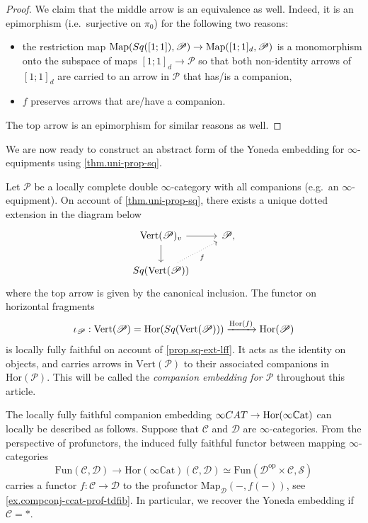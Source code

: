 \documentclass[a4paper, 11pt]{amsart}
\numberwithin{theorem}{section}
\theoremstyle{definition}
\newcommand{\cat}[1]{\textup{#1}}
\newcommand{\op}{\mathrm{op}}
\newcommand{\map}{\mathrm{Map}}
\newcommand{\fun}{\mathrm{Fun}}
\newcommand{\CAT}{\cat{CAT}}
\renewcommand{\S}{\mathscr{S}}
\newcommand{\C}{\mathscr{C}}
\renewcommand{\D}{\mathscr{D}}
\renewcommand{\P}{\mathscr{P}}
\renewcommand{\Vert}{\mathrm{Vert}}
\newcommand{\Hor}{\mathrm{Hor}}
\newcommand{\Sq}{\cat{Sq}}
\newcommand{\CCAT}{\mathbb{C}\mathrm{at}}
\begin{document}
\begin{proof}
	We claim that the middle arrow is an equivalence as well. Indeed, it is an epimorphism (i.e.\ surjective on $\pi_0$) for the following two reasons: 
	\begin{itemize}
	\item the restriction map $\map(\Sq([1;1]), \P) \rightarrow \map([1;1]_d, \P)$ is a monomorphism 
	onto the subspace of maps $[1;1]_d \rightarrow \P$ so that both non-identity arrows of $[1;1]_d$ are carried to an arrow in $\P$ 
	that has/is a companion, 
	\item $f$ preserves arrows that are/have a companion.
	\end{itemize}
	The top arrow is an epimorphism for similar reasons as well.
\end{proof}

We are now ready to construct an abstract form of the Yoneda embedding for $\infty$-equipments using \cref{thm.uni-prop-sq}.


\begin{construction}\label{con.companion-embedding}
	Let $\P$ be a locally complete double $\infty$-category with all companions (e.g.\ an $\infty$-equipment). On account of 
	\cref{thm.uni-prop-sq}, there exists a unique dotted extension in the diagram below 
	\[
		\begin{tikzcd}
			\Vert(\P)_v \arrow[r] \arrow[d] & \P, \\
			\Sq(\Vert(\P)) \arrow[ur, dotted, "f"']
		\end{tikzcd}
	\] 
	where the top arrow is given by the canonical inclusion. 
	The functor on horizontal fragments
	$$
	\iota_\P : \Vert(\P) = \Hor(\Sq(\Vert(\P))) \xrightarrow{\Hor(f)} \Hor(\P) 
	$$
	is locally fully faithful on account of \cref{prop.sq-ext-lff}. It acts as the identity on objects, and carries arrows in $\Vert(\P)$ 
	to their associated companions in $\Hor(\P)$. This will be called the \textit{companion embedding for $\P$} throughout this article.
\end{construction}

\begin{example}
	The locally fully faithful companion embedding $\infty\CAT \rightarrow \Hor(\infty\CCAT)$ can  locally be described as follows. 
	Suppose that $\C$ and $\D$ are $\infty$-categories. From 
	the perspective of profunctors, the induced fully faithful functor between mapping $\infty$-categories
	$$
	\fun(\C,\D) \rightarrow \Hor(\infty\CCAT)(\C, \D) \simeq \fun(\D^\op \times \C, \S)
	$$
	carries a functor $f : \C \rightarrow \D$ to the profunctor $\map_\D(-, f(-))$, see \cref{ex.compconj-ccat-prof-tdfib}. In particular, we recover the Yoneda embedding if $\C = \ast$.
\end{example}
\end{document}
